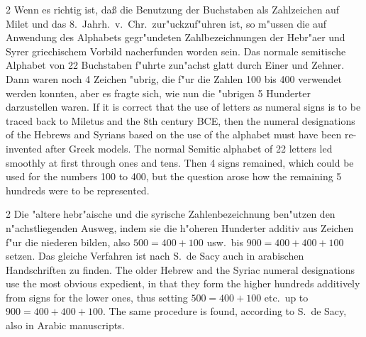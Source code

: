 \documentclass[10pt,a4paper]{article}
\renewcommand{\switchcolumn}{\syncronize\nointerlineskip\columnbreak}
\begin{document}
\begin{paracol}{2}
Wenn es richtig ist, da\ss{} die Benutzung der Buchstaben als Zahlzeichen auf Milet und das 8.\ Jahrh.\ v.\ Chr.\ zur"uckzuf"uhren ist, so m"ussen die auf Anwendung des Alphabets gegr"undeten Zahlbezeichnungen der Hebr"aer und Syrer griechischem Vorbild nacherfunden worden sein. Das normale semitische Alphabet von 22 Buchstaben f"uhrte zun"achst glatt durch Einer und Zehner. Dann waren noch 4 Zeichen "ubrig, die f"ur die Zahlen 100 bis 400 verwendet werden konnten, aber es fragte sich, wie nun die "ubrigen 5 Hunderter darzustellen waren.
\switchcolumn
If it is correct that the use of letters as numeral signs is to be traced back to Miletus and the 8th century BCE, then the numeral designations of the Hebrews and Syrians based on the use of the alphabet must have been re-invented after Greek models. The normal Semitic alphabet of 22 letters led smoothly at first through ones and tens. Then 4 signs remained, which could be used for the numbers 100 to 400, but the question arose how the remaining 5 hundreds were to be represented.
\end{paracol}

\begin{paracol}{2}
Die "altere hebr"aische und die syrische Zahlenbezeichnung ben"utzen den n"achstliegenden Ausweg, indem sie die h"oheren Hunderter additiv aus Zeichen f"ur die niederen bilden, also $500 = 400 + 100$ usw.\ bis $900 = 400 + 400 + 100$ setzen. Das gleiche Verfahren ist nach S.\ de Sacy auch in arabischen Handschriften zu finden.
\switchcolumn
The older Hebrew and the Syriac numeral designations use the most obvious expedient, in that they form the higher hundreds additively from signs for the lower ones, thus setting $500 = 400 + 100$ etc.\ up to $900 = 400 + 400 + 100$. The same procedure is found, according to S.\ de Sacy, also in Arabic manuscripts.
\end{paracol}
\end{document}
